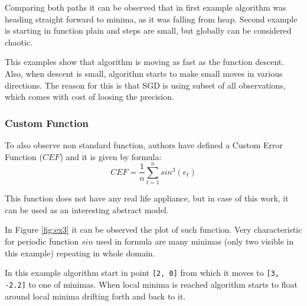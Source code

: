 \documentclass[11pt,a4paper]{IEEEtran}
\begin{document}
Comparing both paths it can be observed that in first example algorithm was heading straight forward to minima, as it was falling from heap. Second example is starting in function plain and steps are small, but globally can be considered chaotic.

This examples show that algorithm is moving as fast as the function descent. Also, when descent is small, algorithm starts to make small moves in various directions. The reason for this is that SGD is using subset of all observations, which comes with cost of loosing the precision.
\\

\subsubsection{Custom Function}

To also observe non standard function, authors have defined a Custom Error Function ($CEF$) and it is given by formula:
$$ CEF = \frac{1}{n}\sum_{t=1}^{n}sin^3(e_t) $$

This function does not have any real life appliance, but in case of this work, it can be used as an interesting abstract model.

In Figure \ref{fig:ex3} it can be observed the plot of such function. Very characteristic for periodic function $sin$ used in formula are many minimas (only two visible in this example) repeating in whole domain.

In this example algorithm start in point \texttt{[2, 0]} from which it moves to \texttt{[3, -2.2]} to one of minimas. When local minima is reached algorithm starts to float around local minima drifting forth and back to it.
\end{document}
